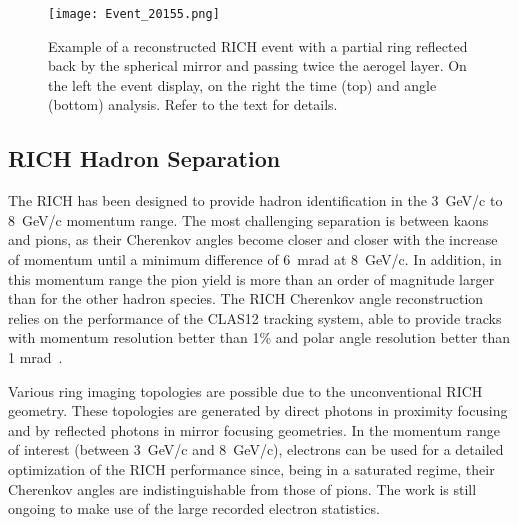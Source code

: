 \documentclass[5p,times,twocolumn]{elsarticle}
\begin{document}
\begin{figure}[!ht]
\begin{center}
\texttt{[image: Event\_20155.png]}
\end{center}
\caption{Example of a reconstructed RICH event with a partial ring reflected back by the spherical mirror and passing twice the aerogel layer. On the left the event display, on the right the time (top) and angle (bottom) analysis. Refer to the text for details.}
\label{Fig:Event4}
\end{figure}

\subsection{RICH Hadron Separation}
\label{sec:HadronID}

The RICH has been designed to provide hadron identification in the 3~GeV/c to  8~GeV/c momentum range. The most
challenging separation is between kaons and pions, as their Cherenkov angles become closer and closer with the
increase of momentum until a minimum difference of 6~mrad at 8~GeV/c. In addition, in this momentum range the
pion yield is more than an order of magnitude larger than for the other hadron species. The RICH Cherenkov 
angle reconstruction relies on the performance of the CLAS12 tracking system, able to provide tracks with
momentum resolution better than 1\% and polar angle resolution better than 1 mrad~\cite{REF:overview-nim}.


Various ring imaging topologies are possible due to the  unconventional RICH geometry. These topologies are generated
by direct photons in proximity focusing and by reflected photons in mirror focusing geometries. In the momentum
range of interest (between 3~GeV/c and 8~GeV/c), electrons can be used for a detailed optimization of the RICH
performance since, being in a saturated regime, their Cherenkov angles are indistinguishable from those of pions.
The work is still ongoing to make use of the large recorded electron statistics.
\end{document}
